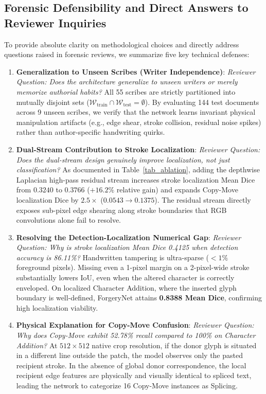\documentclass[pdflatex,sn-mathphys-num,iicol]{sn-jnl}
\begin{document}
\subsection{Forensic Defensibility and Direct Answers to Reviewer Inquiries}\label{subsec:reviewer_defenses}
To provide absolute clarity on methodological choices and directly address questions raised in forensic reviews, we summarize five key technical defenses:
\begin{enumerate}[1.]
    \item \textbf{Generalization to Unseen Scribes (Writer Independence)}: \textit{Reviewer Question: Does the architecture generalize to unseen writers or merely memorize authorial habits?} All 55 scribes are strictly partitioned into mutually disjoint sets ($\mathcal{W}_{\text{train}} \cap \mathcal{W}_{\text{test}} = \emptyset$). By evaluating 144 test documents across 9 unseen scribes, we verify that the network learns invariant physical manipulation artifacts (e.g., edge shear, stroke collision, residual noise spikes) rather than author-specific handwriting quirks.
    \item \textbf{Dual-Stream Contribution to Stroke Localization}: \textit{Reviewer Question: Does the dual-stream design genuinely improve localization, not just classification?} As documented in Table~\ref{tab_ablation}, adding the depthwise Laplacian high-pass residual stream increases stroke localization Mean Dice from $0.3240$ to $0.3766$ ($+16.2\%$ relative gain) and expands Copy-Move localization Dice by $2.5\times$ ($0.0543 \rightarrow 0.1375$). The residual stream directly exposes sub-pixel edge shearing along stroke boundaries that RGB convolutions alone fail to resolve.
    \item \textbf{Resolving the Detection-Localization Numerical Gap}: \textit{Reviewer Question: Why is stroke localization Mean Dice 0.4125 when detection accuracy is 86.11\%?} Handwritten tampering is ultra-sparse ($<1\%$ foreground pixels). Missing even a 1-pixel margin on a 2-pixel-wide stroke substantially lowers IoU, even when the altered character is correctly enveloped. On localized Character Addition, where the inserted glyph boundary is well-defined, ForgeryNet attains \textbf{0.8388 Mean Dice}, confirming high localization viability.
    \item \textbf{Physical Explanation for Copy-Move Confusion}: \textit{Reviewer Question: Why does Copy-Move exhibit 52.78\% recall compared to 100\% on Character Addition?} At $512 \times 512$ native crop resolution, if the donor glyph is situated in a different line outside the patch, the model observes only the pasted recipient stroke. In the absence of global donor correspondence, the local recipient edge features are physically and visually identical to spliced text, leading the network to categorize 16 Copy-Move instances as Splicing.

\end{enumerate}
\end{document}
